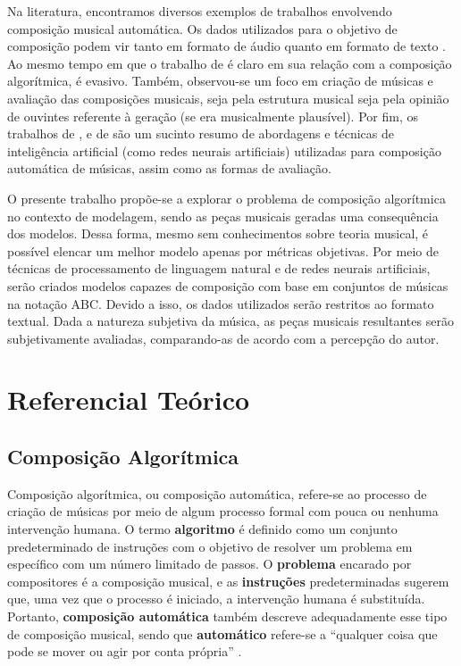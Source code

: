 \documentclass[twoside]{automatextcc}
\begin{document}
Na literatura, encontramos diversos exemplos de trabalhos envolvendo composição musical automática. Os dados utilizados para o objetivo de composição podem vir tanto em formato de áudio \citep[como o de][]{kuang2021} quanto em formato de texto \citep[como o de][]{agarwala2017}. Ao mesmo tempo em que o trabalho de \citet{colombo2016} é claro em sua relação com a composição algorítmica, \citet{souza2018} é evasivo. Também, observou-se um foco em criação de músicas e avaliação das composições musicais, seja pela estrutura musical seja pela opinião de ouvintes referente à geração (se era musicalmente plausível). Por fim, os trabalhos de \citet{fernandez2013}, \citet{ji2020} e de \citet{olivan2021} são um sucinto resumo de abordagens e técnicas de inteligência artificial (como redes neurais artificiais) utilizadas para composição automática de músicas, assim como as formas de avaliação. 

O presente trabalho propõe-se a explorar o problema de composição algorítmica no contexto de modelagem, sendo as peças musicais geradas uma consequência dos modelos. Dessa forma, mesmo sem conhecimentos sobre teoria musical, é possível elencar um melhor modelo apenas por métricas objetivas. Por meio de técnicas de processamento de linguagem natural e de redes neurais artificiais, serão criados modelos capazes de composição com base em conjuntos de músicas na notação ABC. Devido a isso, os dados utilizados serão restritos ao formato textual. Dada a natureza subjetiva da música, as peças musicais resultantes serão subjetivamente avaliadas, comparando-as de acordo com a percepção do autor.



\chapter{Referencial Teórico}

\section{Composição Algorítmica}
Composição algorítmica, ou composição automática, refere-se ao processo de criação de músicas por meio de algum processo formal com pouca ou nenhuma intervenção humana. O termo \textbf{algoritmo} é definido como um conjunto predeterminado de instruções com o objetivo de resolver um problema em específico com um número limitado de passos. O \textbf{problema} encarado por compositores é a composição musical, e as \textbf{instruções} predeterminadas sugerem que, uma vez que o processo é iniciado, a intervenção humana é substituída. Portanto, \textbf{composição automática} também descreve adequadamente esse tipo de composição musical, sendo que \textbf{automático} refere-se a ``qualquer coisa que pode se mover ou agir por conta própria'' \citep{alpern1995, maurer}.
\end{document}
